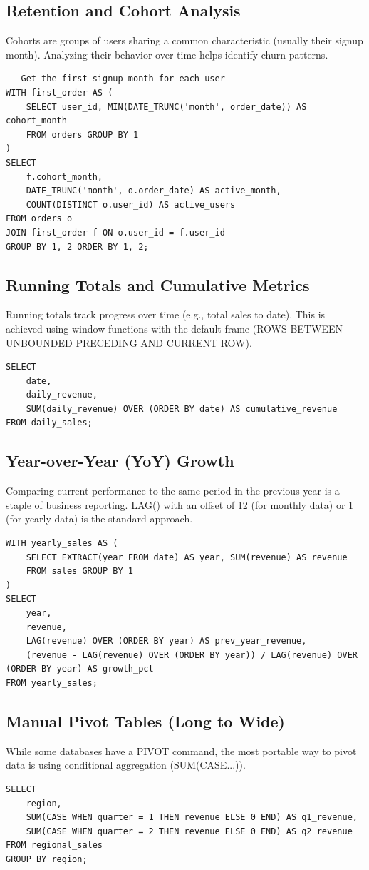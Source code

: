\documentclass[12pt, a4paper]{article}
\begin{document}
\subsection{Retention and Cohort Analysis}
Cohorts are groups of users sharing a common characteristic (usually their signup month). Analyzing their behavior over time helps identify churn patterns.
\begin{verbatim}
-- Get the first signup month for each user
WITH first_order AS (
    SELECT user_id, MIN(DATE_TRUNC('month', order_date)) AS cohort_month
    FROM orders GROUP BY 1
)
SELECT 
    f.cohort_month,
    DATE_TRUNC('month', o.order_date) AS active_month,
    COUNT(DISTINCT o.user_id) AS active_users
FROM orders o
JOIN first_order f ON o.user_id = f.user_id
GROUP BY 1, 2 ORDER BY 1, 2;
\end{verbatim}

\subsection{Running Totals and Cumulative Metrics}
Running totals track progress over time (e.g., total sales to date). This is achieved using window functions with the default frame (ROWS BETWEEN UNBOUNDED PRECEDING AND CURRENT ROW).
\begin{verbatim}
SELECT 
    date, 
    daily_revenue,
    SUM(daily_revenue) OVER (ORDER BY date) AS cumulative_revenue
FROM daily_sales;
\end{verbatim}

\subsection{Year-over-Year (YoY) Growth}
Comparing current performance to the same period in the previous year is a staple of business reporting. LAG() with an offset of 12 (for monthly data) or 1 (for yearly data) is the standard approach.
\begin{verbatim}
WITH yearly_sales AS (
    SELECT EXTRACT(year FROM date) AS year, SUM(revenue) AS revenue
    FROM sales GROUP BY 1
)
SELECT 
    year, 
    revenue,
    LAG(revenue) OVER (ORDER BY year) AS prev_year_revenue,
    (revenue - LAG(revenue) OVER (ORDER BY year)) / LAG(revenue) OVER (ORDER BY year) AS growth_pct
FROM yearly_sales;
\end{verbatim}

\subsection{Manual Pivot Tables (Long to Wide)}
While some databases have a PIVOT command, the most portable way to pivot data is using conditional aggregation (SUM(CASE...)).
\begin{verbatim}
SELECT 
    region,
    SUM(CASE WHEN quarter = 1 THEN revenue ELSE 0 END) AS q1_revenue,
    SUM(CASE WHEN quarter = 2 THEN revenue ELSE 0 END) AS q2_revenue
FROM regional_sales
GROUP BY region;
\end{verbatim}
\end{document}
